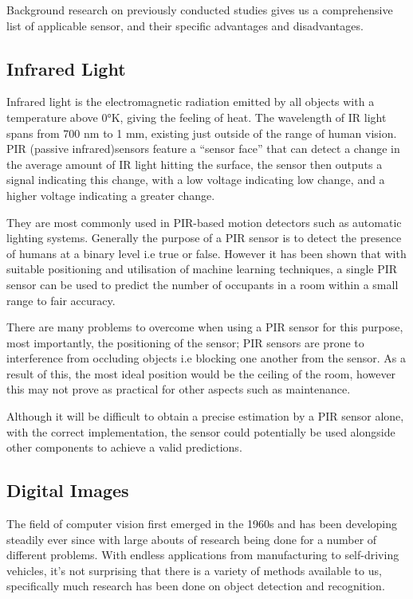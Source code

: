 \documentclass{l4proj}
\begin{document}
Background research on previously conducted studies gives us a comprehensive list of applicable sensor, and their specific advantages and disadvantages.

\subsection{Infrared Light}
Infrared light is the electromagnetic radiation emitted by all objects with a temperature above 0°K, giving the feeling of heat. The wavelength of IR light spans from 700 nm to 1 mm, existing just outside of the range of human vision\cite{c-inred}. PIR (passive infrared)sensors feature a “sensor face” that can detect a change in the average amount of IR light hitting the surface, the sensor then outputs a signal indicating this change, with a low voltage indicating low change, and a higher voltage indicating a greater change\cite{c-pir}.

They are most commonly used in PIR-based motion detectors such as automatic lighting systems. Generally the purpose of a PIR sensor is to detect the presence of humans at a binary level i.e true or false. However it has been shown that with suitable positioning and utilisation of machine learning techniques, a single PIR sensor can be used to predict the number of occupants in a room within a small range to fair accuracy\cite{c-pir-study}.

There are many problems to overcome when using a PIR sensor for this purpose, most importantly, the positioning of the sensor; PIR sensors are prone to interference from occluding objects i.e blocking one another from the sensor. As a result of this, the most ideal position would be the ceiling of the room, however this may not prove as practical for other aspects such as maintenance\cite{c-pir-study}.

Although it will be difficult to obtain a precise estimation by a PIR sensor alone, with the correct implementation, the sensor could potentially be used alongside other components to achieve a valid predictions.

\subsection{Digital Images}
The field of computer vision first emerged in the 1960s and has been developing steadily ever since with large abouts of research being done for a number of different problems. With endless applications from manufacturing to self-driving vehicles, it’s not surprising that there is a variety of methods available to us, specifically much research has been done on object detection and recognition. 
\end{document}

